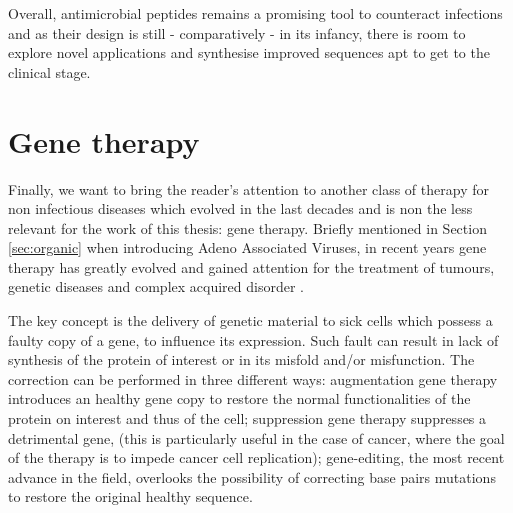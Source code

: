 Overall, antimicrobial peptides remains a promising tool to counteract infections and as their design is still - comparatively - in its infancy, there is room to explore novel applications and synthesise improved sequences apt to get to the clinical stage.


\section{Gene therapy}
Finally, we want to bring the reader's attention to another class of therapy for non infectious diseases which evolved in the last decades and is non the less relevant for the work of this thesis: gene therapy. Briefly mentioned in Section \ref{sec:organic} when introducing Adeno Associated Viruses, in recent years gene therapy has greatly evolved and gained attention for the treatment of tumours, genetic diseases and complex acquired disorder \cite{Anguela2019}.

The key concept is the delivery of genetic material to sick cells which possess a faulty copy of a gene, to influence its expression. Such fault can result in lack of synthesis of the protein of interest or in its misfold and/or misfunction. The correction can be performed in three different ways: augmentation gene therapy introduces an healthy gene copy to restore the normal functionalities of the protein on interest and thus of the cell; suppression gene therapy suppresses a detrimental gene, (this is particularly useful in the case of cancer, where the goal of the therapy is to impede cancer cell replication); gene-editing, the most recent advance in the field, overlooks the possibility of correcting base pairs mutations to restore the original healthy sequence.

